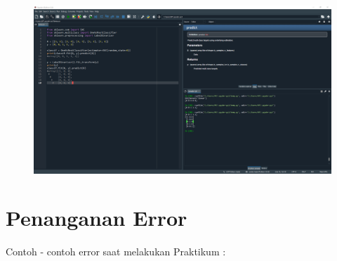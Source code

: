 \begin{enumerate}
\begin{figure}[!htbp]
\end{figure}
\newpage
\begin{figure}[!htbp]
	\centering
	\includegraphics[scale=0.3]{figures/6.png}
\end{figure}

\end{enumerate}
\section{Penanganan Error}
Contoh - contoh error saat melakukan Praktikum :

